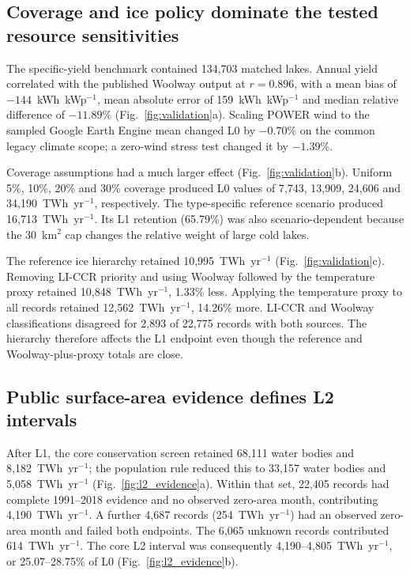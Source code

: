 \subsection{Coverage and ice policy dominate the tested resource sensitivities}

The specific-yield benchmark contained 134{,}703 matched lakes. Annual yield correlated with the published Woolway output at $r=0.896$, with a mean bias of $-144$~kWh~kWp$^{-1}$, mean absolute error of 159~kWh~kWp$^{-1}$ and median relative difference of $-11.89\%$ (Fig.~\ref{fig:validation}a). Scaling POWER wind to the sampled Google Earth Engine mean changed L0 by $-0.70\%$ on the common legacy climate scope; a zero-wind stress test changed it by $-1.39\%$.

Coverage assumptions had a much larger effect (Fig.~\ref{fig:validation}b). Uniform 5\%, 10\%, 20\% and 30\% coverage produced L0 values of 7{,}743, 13{,}909, 24{,}606 and 34{,}190~TWh~yr$^{-1}$, respectively. The type-specific reference scenario produced 16{,}713~TWh~yr$^{-1}$. Its L1 retention (65.79\%) was also scenario-dependent because the 30~km$^2$ cap changes the relative weight of large cold lakes.

The reference ice hierarchy retained 10{,}995~TWh~yr$^{-1}$ (Fig.~\ref{fig:validation}c). Removing LI-CCR priority and using Woolway followed by the temperature proxy retained 10{,}848~TWh~yr$^{-1}$, 1.33\% less. Applying the temperature proxy to all records retained 12{,}562~TWh~yr$^{-1}$, 14.26\% more. LI-CCR and Woolway classifications disagreed for 2{,}893 of 22{,}775 records with both sources. The hierarchy therefore affects the L1 endpoint even though the reference and Woolway-plus-proxy totals are close.

\subsection{Public surface-area evidence defines L2 intervals}

After L1, the core conservation screen retained 68{,}111 water bodies and 8{,}182~TWh~yr$^{-1}$; the population rule reduced this to 33{,}157 water bodies and 5{,}058~TWh~yr$^{-1}$ (Fig.~\ref{fig:l2_evidence}a). Within that set, 22{,}405 records had complete 1991--2018 evidence and no observed zero-area month, contributing 4{,}190~TWh~yr$^{-1}$. A further 4{,}687 records (254~TWh~yr$^{-1}$) had an observed zero-area month and failed both endpoints. The 6{,}065 unknown records contributed 614~TWh~yr$^{-1}$. The core L2 interval was consequently 4{,}190--4{,}805~TWh~yr$^{-1}$, or 25.07--28.75\% of L0 (Fig.~\ref{fig:l2_evidence}b).

